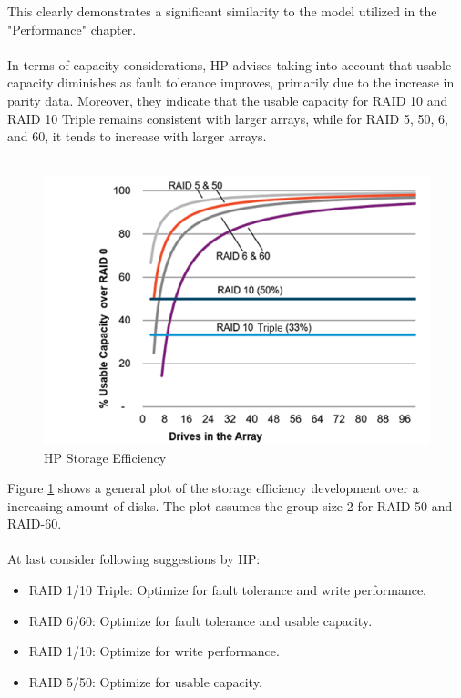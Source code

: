 \documentclass{article}
\begin{document}
This clearly demonstrates a significant similarity to the model utilized in the "Performance" chapter.
\\ \\
In terms of capacity considerations, HP advises taking into account that usable capacity diminishes
as fault tolerance improves, primarily due to the increase in parity data.
Moreover, they indicate that the usable capacity for RAID 10 and RAID 10 Triple remains consistent with larger arrays,
while for RAID 5, 50, 6, and 60, it tends to increase with larger arrays. \cite{hpe:sa-userguide}
\\ \\
\begin{figure}
    \includegraphics[width=\textwidth]{hp-storage-efficiency}
    \caption{HP Storage Efficiency \cite{hpe:sa-userguide}}
    \label{fig:hp-storage-efficiency}
\end{figure}
Figure \ref{fig:hp-storage-efficiency} shows a general plot of the storage efficiency development
over a increasing amount of disks. The plot assumes the group size 2 for RAID-50 and RAID-60. \cite{hpe:sa-userguide}
\\ \\
At last consider following suggestions by HP:
\begin{itemize}
    \item RAID 1/10 Triple: Optimize for fault tolerance and write performance.
    \item RAID 6/60: Optimize for fault tolerance and usable capacity.
    \item RAID 1/10: Optimize for write performance.
    \item RAID 5/50: Optimize for usable capacity.
\end{itemize}
\end{document}

